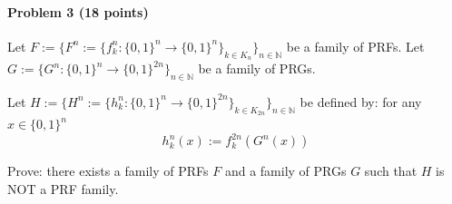 \paragraph{Problem 3 (18 points)}
Let $F:=\{ F^n:=\{ f^n_k: \{0,1\}^n \to \{0,1\}^n  \}_{k\in K_n} \}_{n\in\mathbb{N}}$ be a family of PRFs. 
Let $G:=\{ G^n: \{0,1\}^n \to \{0,1\}^{2n}  \}_{n\in\mathbb{N}}$ be a family of PRGs. 

Let $H:=\{ H^n:=\{ h^n_k: \{0,1\}^n \to \{0,1\}^{2n}  \}_{k\in K_{2n}} \}_{n\in\mathbb{N}}$
be defined by: for any $x\in\{0,1\}^n$ 
\[ h^n_k(x) := f^{2n}_k(G^n(x))   \]

Prove: there exists a family of PRFs $F$ and a family of PRGs $G$ such that $H$ is NOT a PRF family.

